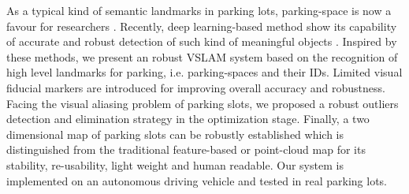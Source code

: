 \documentclass[journal]{IEEEtran}
\begin{document}
%

	
As a typical kind of semantic landmarks in parking lots, parking-space is now a favour for researchers
\citep{Houben:2015hq} \citep{Grimmett2015Integrating} \citep{Himstedt2017Online}.
Recently, deep learning-based method show its capability of  accurate and robust detection of such kind of meaningful objects \citep{zhanglin}. 
Inspired by these methods, we present an robust VSLAM system based on the recognition of high level landmarks for parking, i.e. parking-spaces and their IDs. 
Limited visual fiducial markers are introduced for improving overall accuracy and robustness. 
Facing the visual aliasing problem of parking slots, we proposed a robust outliers detection and elimination strategy in the optimization stage.
Finally, a two dimensional map of parking slots can be robustly established which is distinguished from the traditional feature-based or point-cloud map for its stability, re-usability, light weight and human readable.
Our system is implemented on an autonomous driving vehicle and tested in real parking lots.
\end{document}
